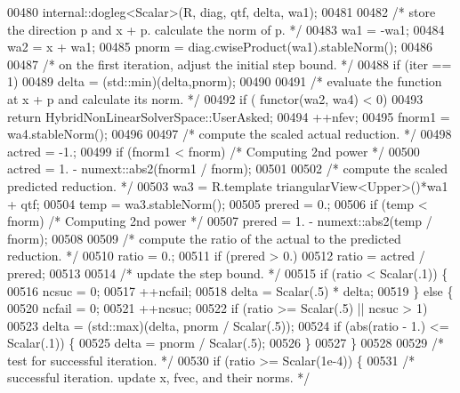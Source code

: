 \begin{DoxyCode}
00480         internal::dogleg<Scalar>(R, diag, qtf, delta, wa1);
00481 
00482         \textcolor{comment}{/* store the direction p and x + p. calculate the norm of p. */}
00483         wa1 = -wa1;
00484         wa2 = x + wa1;
00485         pnorm = diag.cwiseProduct(wa1).stableNorm();
00486 
00487         \textcolor{comment}{/* on the first iteration, adjust the initial step bound. */}
00488         \textcolor{keywordflow}{if} (iter == 1)
00489             delta = (std::min)(delta,pnorm);
00490 
00491         \textcolor{comment}{/* evaluate the function at x + p and calculate its norm. */}
00492         \textcolor{keywordflow}{if} ( functor(wa2, wa4) < 0)
00493             \textcolor{keywordflow}{return} HybridNonLinearSolverSpace::UserAsked;
00494         ++nfev;
00495         fnorm1 = wa4.stableNorm();
00496 
00497         \textcolor{comment}{/* compute the scaled actual reduction. */}
00498         actred = -1.;
00499         \textcolor{keywordflow}{if} (fnorm1 < fnorm) \textcolor{comment}{/* Computing 2nd power */}
00500             actred = 1. - numext::abs2(fnorm1 / fnorm);
00501 
00502         \textcolor{comment}{/* compute the scaled predicted reduction. */}
00503         wa3 = R.template triangularView<Upper>()*wa1 + qtf;
00504         temp = wa3.stableNorm();
00505         prered = 0.;
00506         \textcolor{keywordflow}{if} (temp < fnorm) \textcolor{comment}{/* Computing 2nd power */}
00507             prered = 1. - numext::abs2(temp / fnorm);
00508 
00509         \textcolor{comment}{/* compute the ratio of the actual to the predicted reduction. */}
00510         ratio = 0.;
00511         \textcolor{keywordflow}{if} (prered > 0.)
00512             ratio = actred / prered;
00513 
00514         \textcolor{comment}{/* update the step bound. */}
00515         \textcolor{keywordflow}{if} (ratio < Scalar(.1)) \{
00516             ncsuc = 0;
00517             ++ncfail;
00518             delta = Scalar(.5) * delta;
00519         \} \textcolor{keywordflow}{else} \{
00520             ncfail = 0;
00521             ++ncsuc;
00522             \textcolor{keywordflow}{if} (ratio >= Scalar(.5) || ncsuc > 1)
00523                 delta = (std::max)(delta, pnorm / Scalar(.5));
00524             \textcolor{keywordflow}{if} (abs(ratio - 1.) <= Scalar(.1)) \{
00525                 delta = pnorm / Scalar(.5);
00526             \}
00527         \}
00528 
00529         \textcolor{comment}{/* test for successful iteration. */}
00530         \textcolor{keywordflow}{if} (ratio >= Scalar(1e-4)) \{
00531             \textcolor{comment}{/* successful iteration. update x, fvec, and their norms. */}

\end{DoxyCode}
